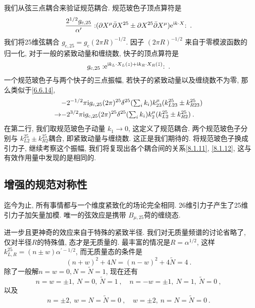 我们从弦三点耦合来验证规范耦合. 规范玻色子顶点算符是
\begin{equation}
	\frac{2^{1 / 2} g_{\mathrm{c}, 25}}{\alpha^{\prime}}:\mathrel{(\partial X^{\mu} \bar{\partial} X^{25} \pm 
	\partial X^{25} \bar{\partial} X^{\mu}) \mathrm{e}^{\mathrm{i} k \cdot X}}: \:. \label{8.3.5}
\end{equation}
我们将25维弦耦合 $g_{\mathrm{c}, 25}=g_{\mathrm{c}}(2 \pi R)^{-1 / 2}$. 因子 $(2 \pi R)^{-1 / 2}$ 来自于零模波函数的归一化, 
对于一般的紧致动量和缠绕数, 快子的顶点算符是
\begin{equation}
	g_{\mathrm{c}, 25}:\mathrel{ \mathrm{e}^{\mathrm{i} k_{L} \cdot X_{L}(z)+\mathrm{i} k_{R} \cdot X_{R}(\bar{z})}}: \:.
\end{equation}
一个规范玻色子与两个快子的三点振幅, 若快子的紧致动量以及缠绕数不为零, 那么类似于\eqref{6.6.14},
\begin{align}
	& {-}2^{-1 / 2} \pi \mathrm{i} g_{\mathrm{c}, 25}(2 \pi)^{25} \delta^{25}({\textstyle\sum_{i} k_{i}}) k_{23}^{\mu}
	(k_{L 23}^{25} \pm k_{R 23}^{25}) \nonumber \\
	\to & {-}2^{3 / 2} \pi \mathrm{i} g_{\mathrm{c}, 25}(2 \pi)^{25} \delta^{25}({\textstyle \sum_{i} k_{i}}) k_{2}^{\mu}
	(k_{L 2}^{25} \pm k_{R 2}^{25}) \:. \label{8.3.7}
\end{align}
在第二行, 我们取规范玻色子动量 $k_{1} \rightarrow 0$, 这定义了规范耦合. 两个规范玻色子分别与 $k_{L 2}^{25} \pm k_{R 2}^{25}$耦合, 即紧致动量与缠绕数. 
这正是我们期待的. 将规范玻色子换成引力子, 继续考察这个振幅, 我们将复现出各个耦合间的关系\eqref{8.1.11}, \eqref{8.1.12}, 这与有效作用量中发现的是相同的.

\subsection*{增强的规范对称性}

迄今为止, 所有事情都与一个维度紧致化的场论完全相同. 26维引力子产生了25维引力子加矢量加模. 唯一的弦效应是携带 $B_{\mu, 25}$荷的缠绕态.

进一步且更神奇的效应来自于特殊的紧致半径. 我们对无质量频谱的讨论省略了, 仅对半径$R $的特殊值, 态才是无质量的. 最丰富的情况是$R=\alpha^{1 / 2}$, 
这样 $k_{L, R}^{25}=(n \pm w) \alpha^{\prime-1 / 2}$, 而无质量态的条件是
\begin{equation}
	(n+w)^{2}+4 N=(n-w)^{2}+4 \tilde{N}=4 \:. \label{8.3.8}
\end{equation}
除了一般解$n=w=0, N=\tilde{N}=1$, 现在还有
\begin{equation}
	n=w=\pm 1,\: N=0,\: \tilde{N}=1\:, \quad n=-w=\pm 1, \: N=1, \:\tilde{N}=0 \:, \label{8.3.9}
\end{equation}
以及
\begin{equation}
	n=\pm 2,\: w=N=\tilde{N}=0\:, \quad w=\pm 2, \: n=N=\tilde{N}=0 \:. \label{8.3.10}
\end{equation}


